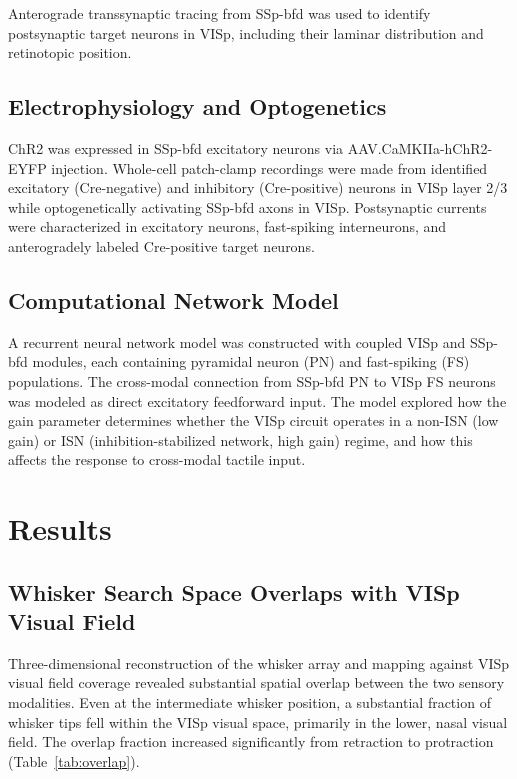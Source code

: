 \documentclass[11pt]{article}
\begin{document}
Anterograde transsynaptic tracing from SSp-bfd was used to identify postsynaptic target neurons in VISp, including their laminar distribution and retinotopic position.

\subsection{Electrophysiology and Optogenetics}

ChR2 was expressed in SSp-bfd excitatory neurons via AAV.CaMKIIa-hChR2-EYFP injection. Whole-cell patch-clamp recordings were made from identified excitatory (Cre-negative) and inhibitory (Cre-positive) neurons in VISp layer 2/3 while optogenetically activating SSp-bfd axons in VISp. Postsynaptic currents were characterized in excitatory neurons, fast-spiking interneurons, and anterogradely labeled Cre-positive target neurons.

\subsection{Computational Network Model}

A recurrent neural network model was constructed with coupled VISp and SSp-bfd modules, each containing pyramidal neuron (PN) and fast-spiking (FS) populations. The cross-modal connection from SSp-bfd PN to VISp FS neurons was modeled as direct excitatory feedforward input. The model explored how the gain parameter determines whether the VISp circuit operates in a non-ISN (low gain) or ISN (inhibition-stabilized network, high gain) regime, and how this affects the response to cross-modal tactile input.

\section{Results}

\subsection{Whisker Search Space Overlaps with VISp Visual Field}

Three-dimensional reconstruction of the whisker array and mapping against VISp visual field coverage revealed substantial spatial overlap between the two sensory modalities. Even at the intermediate whisker position, a substantial fraction of whisker tips fell within the VISp visual space, primarily in the lower, nasal visual field. The overlap fraction increased significantly from retraction to protraction (Table~\ref{tab:overlap}).
\end{document}

